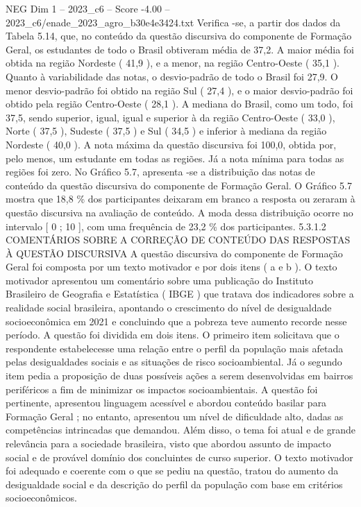 \begin{textsample}{NEG Dim 1 – 2023\_c6 – Score -4.00 – 2023\_c6/enade\_2023\_agro\_b30e4e3424.txt}
Verifica -se, a partir dos dados da Tabela 5.14, que, no conteúdo da questão discursiva do componente de Formação Geral, os estudantes de todo o Brasil obtiveram média de 37,2.
A maior média foi obtida na região Nordeste ( 41,9 ), e a menor, na região Centro-Oeste ( 35,1 ).
Quanto à variabilidade das notas, o desvio-padrão de todo o Brasil foi 27,9.
O menor desvio-padrão foi obtido na região Sul ( 27,4 ), e o maior desvio-padrão foi obtido pela região Centro-Oeste ( 28,1 ).
A mediana do Brasil, como um todo, foi 37,5, sendo superior, igual, igual e superior à da região Centro-Oeste ( 33,0 ), Norte ( 37,5 ), Sudeste ( 37,5 ) e Sul ( 34,5 ) e inferior à mediana da região Nordeste ( 40,0 ).
A nota máxima da questão discursiva foi 100,0, obtida por, pelo menos, um estudante em todas as regiões.
Já a nota mínima para todas as regiões foi zero.
No Gráfico 5.7, apresenta -se a distribuição das notas de conteúdo da questão discursiva do componente de Formação Geral.
O Gráfico 5.7 mostra que 18,8 \% dos participantes deixaram em branco a resposta ou zeraram à questão discursiva na avaliação de conteúdo.
A moda dessa distribuição ocorre no intervalo [ 0 ; 10 ], com uma frequência de 23,2 \% dos participantes. 5.3.1.2 COMENTÁRIOS SOBRE A CORREÇÃO DE CONTEÚDO DAS RESPOSTAS À QUESTÃO DISCURSIVA A questão discursiva do componente de Formação Geral foi composta por um texto motivador e por dois itens ( a e b ).
O texto motivador apresentou um comentário sobre uma publicação do Instituto Brasileiro de Geografia e Estatística ( IBGE ) que tratava dos indicadores sobre a realidade social brasileira, apontando o crescimento do nível de desigualdade socioeconômica em 2021 e concluindo que a pobreza teve aumento recorde nesse período.
A questão foi dividida em dois itens.
O primeiro item solicitava que o respondente estabelecesse uma relação entre o perfil da população mais afetada pelas desigualdades sociais e as situações de risco socioambiental.
Já o segundo item pedia a proposição de duas possíveis ações a serem desenvolvidas em bairros periféricos a fim de minimizar os impactos socioambientais.
A questão foi pertinente, apresentou linguagem acessível e abordou conteúdo basilar para Formação Geral ; no entanto, apresentou um nível de dificuldade alto, dadas as competências intrincadas que demandou.
Além disso, o tema foi atual e de grande relevância para a sociedade brasileira, visto que abordou assunto de impacto social e de provável domínio dos concluintes de curso superior.
O texto motivador foi adequado e coerente com o que se pediu na questão, tratou do aumento da desigualdade social e da descrição do perfil da população com base em critérios socioeconômicos.

\end{textsample}
